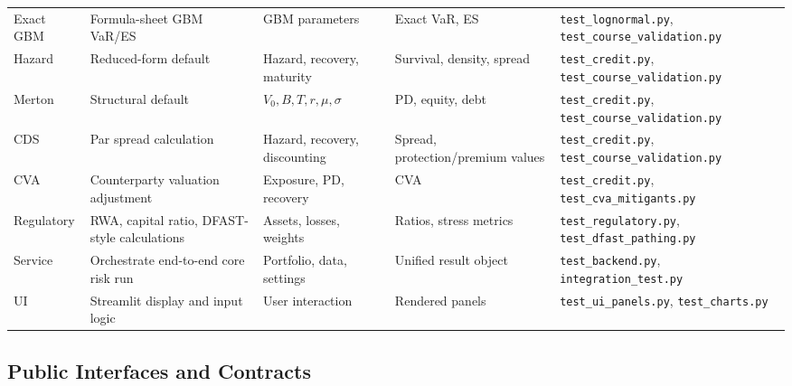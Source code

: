 \documentclass[11pt]{article}
\newcommand{\code}[1]{\texttt{#1}}
\begin{document}
\begin{center}
\begin{tabular}{L{2.2cm}L{3.5cm}L{2.4cm}L{2.2cm}L{3.0cm}}
Exact GBM & Formula-sheet GBM VaR/ES & GBM parameters & Exact VaR, ES & \code{test\_lognormal.py}, \code{test\_course\_\allowbreak validation.py} \\
Hazard & Reduced-form default & Hazard, recovery, maturity & Survival, density, spread & \code{test\_credit.py}, \code{test\_course\_\allowbreak validation.py} \\
Merton & Structural default & $V_0,B,T,r,\mu,\sigma$ & PD, equity, debt & \code{test\_credit.py}, \code{test\_course\_\allowbreak validation.py} \\
CDS & Par spread calculation & Hazard, recovery, discounting & Spread, protection/premium values & \code{test\_credit.py}, \code{test\_course\_\allowbreak validation.py} \\
CVA & Counterparty valuation adjustment & Exposure, PD, recovery & CVA & \code{test\_credit.py}, \code{test\_cva\_mitigants.py} \\
Regulatory & RWA, capital ratio, DFAST-style calculations & Assets, losses, weights & Ratios, stress metrics & \code{test\_regulatory.py}, \code{test\_dfast\_pathing.py} \\
Service & Orchestrate end-to-end core risk run & Portfolio, data, settings & Unified result object & \code{test\_backend.py}, \code{integration\_test.py} \\
UI & Streamlit display and input logic & User interaction & Rendered panels & \code{test\_ui\_panels.py}, \code{test\_charts.py} \\
\bottomrule
\end{tabular}
\end{center}

\subsection{Public Interfaces and Contracts}
\end{document}
